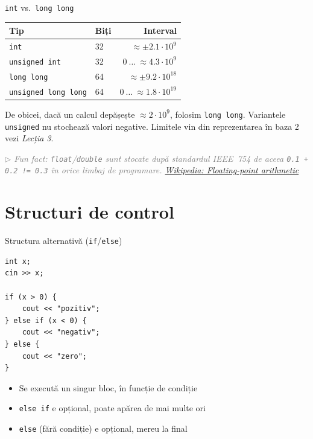 \documentclass{beamer}
\begin{document}
\begin{frame}{\texttt{int} vs.\ \texttt{long long}}
  \begin{center}
  \begin{tabular}{llr}
    \toprule
    Tip & Biți & Interval \\
    \midrule
    \texttt{int}                & 32 & $\approx \pm 2.1 \cdot 10^9$ \\
    \texttt{unsigned int}       & 32 & $0\ \ldots\ \approx 4.3 \cdot 10^9$ \\
    \texttt{long long}          & 64 & $\approx \pm 9.2 \cdot 10^{18}$ \\
    \texttt{unsigned long long} & 64 & $0\ \ldots\ \approx 1.8 \cdot 10^{19}$ \\
    \bottomrule
  \end{tabular}
  \end{center}

  \smallskip
  De obicei, dacă un calcul depășește $\approx 2 \cdot 10^9$, folosim \texttt{long long}. Variantele \texttt{unsigned} nu stochează valori negative. Limitele vin din reprezentarea în baza 2 \textemdash{} vezi \emph{Lecția 3}.

  \vfill
  {\footnotesize\textcolor{gray}{\textit{$\triangleright$ Fun fact: \texttt{float}/\texttt{double} sunt stocate după standardul IEEE~754 \textemdash{} de aceea \texttt{0.1 + 0.2 != 0.3} în orice limbaj de programare. \href{https://en.wikipedia.org/wiki/Floating-point_arithmetic\#IEEE_754:_floating_point_in_modern_computers}{Wikipedia: Floating-point arithmetic}}}}
\end{frame}

\section{Structuri de control}

\begin{frame}[fragile]{Structura alternativă (\texttt{if}/\texttt{else})}
  \begin{lstlisting}
int x;
cin >> x;

if (x > 0) {
    cout << "pozitiv";
} else if (x < 0) {
    cout << "negativ";
} else {
    cout << "zero";
}
  \end{lstlisting}
  \begin{itemize}
    \item Se execută un singur bloc, în funcție de condiție
    \item \lstinline|else if| e opțional, poate apărea de mai multe ori
    \item \lstinline|else| (fără condiție) e opțional, mereu la final
  \end{itemize}
\end{frame}
\end{document}
